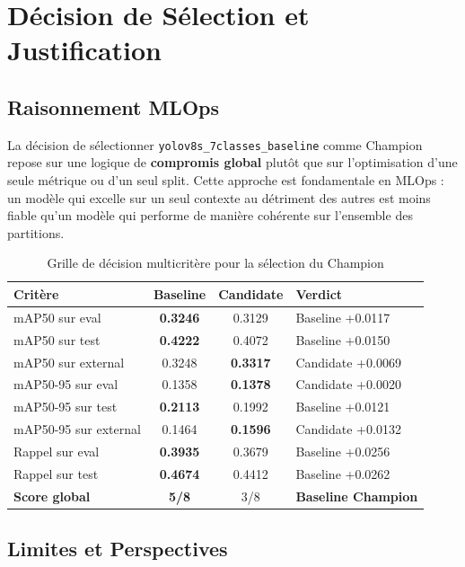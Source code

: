 \documentclass{rapportENSIAS}
\begin{document}
\section{Décision de Sélection et Justification}

\subsection{Raisonnement MLOps}

La décision de sélectionner \texttt{yolov8s\_7classes\_baseline}
comme Champion repose sur une logique de \textbf{compromis global}
plutôt que sur l'optimisation d'une seule métrique ou d'un seul split.
Cette approche est fondamentale en MLOps : un modèle qui excelle
sur un seul contexte au détriment des autres est moins fiable
qu'un modèle qui performe de manière cohérente sur l'ensemble
des partitions.

\begin{table}[H]
\centering
\caption{Grille de décision multicritère pour la sélection du Champion}
\label{tab:decision_grille}
\begin{tabular}{p{4.5cm} cc p{4.5cm}}
\toprule
\textbf{Critère} & \textbf{Baseline} & \textbf{Candidate} & \textbf{Verdict} \\
\midrule
mAP50 sur eval         & \textbf{0.3246} & 0.3129 & Baseline +0.0117 \\
mAP50 sur test         & \textbf{0.4222} & 0.4072 & Baseline +0.0150 \\
mAP50 sur external     & 0.3248 & \textbf{0.3317} & Candidate +0.0069 \\
mAP50-95 sur eval      & 0.1358 & \textbf{0.1378} & Candidate +0.0020 \\
mAP50-95 sur test      & \textbf{0.2113} & 0.1992 & Baseline +0.0121 \\
mAP50-95 sur external  & 0.1464 & \textbf{0.1596} & Candidate +0.0132 \\
Rappel sur eval        & \textbf{0.3935} & 0.3679 & Baseline +0.0256 \\
Rappel sur test        & \textbf{0.4674} & 0.4412 & Baseline +0.0262 \\
\midrule
\textbf{Score global}  & \textbf{5/8} & 3/8 & \textbf{Baseline Champion} \\
\bottomrule
\end{tabular}
\end{table}

\subsection{Limites et Perspectives}
\end{document}
